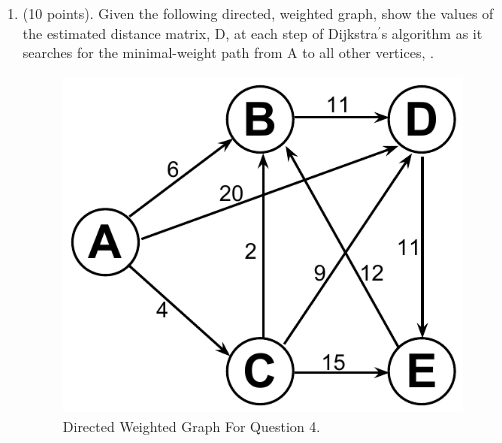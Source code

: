 \documentclass{article}
\newcommand{\answer}{\textbf{\\\underline{ANSWER:}\\}}
\begin{document}
\begin{enumerate}
\begin{enumerate}[a.]
\item The graph has 10,000 vertices and 20,000,000 edges, and it is
important to use as little space as possible.
\answer As $n^2=10000^2=10^8$, which is of the same order as
$20,000,000$. But if we store graph using adjacency matrix, still
 $80\%$ of the matrix element is 0. This reason together with the
space constraint requirement make the adjacency list a preferable
choice over adjacency matrix.

\item You need to answer the query areAdjacent() as fast as possible, no
matter how much space you use.
\answer The time complexity of \textbf{areAdjacentVertices()}
operation for adjacency list $O$(min(deg(u),deg(v))) as compared
with $O(1)$ for adjacency matrix makes adjacency matrix the better
choice.

\end{enumerate}

\item (10 points). Given the following directed, weighted graph, show
  the values of the estimated distance matrix, D, at each step of
  Dijkstra$^{\prime}$s algorithm as it searches for the minimal-weight
  path from A to all other vertices, . 
 
\begin{figure}[H]
  \begin{center}
    \includegraphics[scale=0.5]{q4-graph}
    \caption{Directed Weighted Graph For Question 4.\label{tbl:dij_alg}}
  \end{center}
  \vspace{-20pt}
\end{figure}


\end{enumerate}
\end{document}
